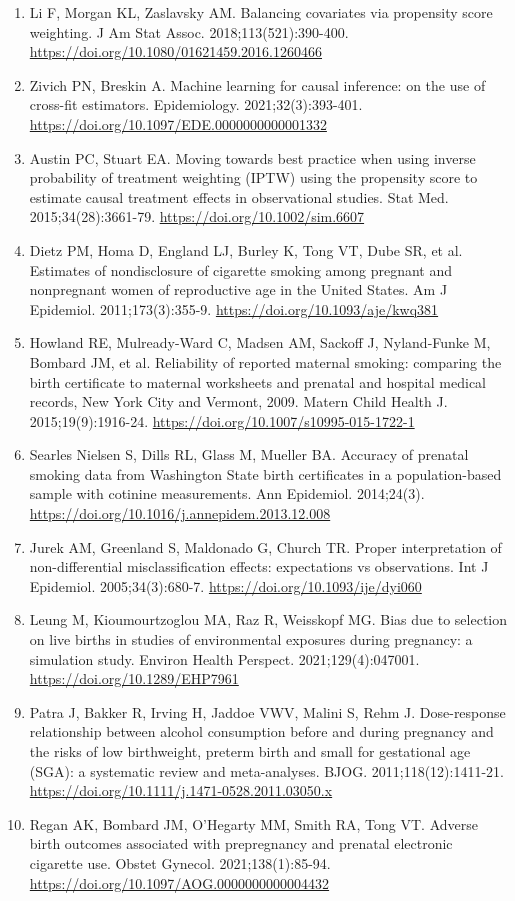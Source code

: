 {\begin{enumerate}[leftmargin=2.4em,labelsep=0.4em,itemsep=2pt,parsep=0pt,label={\arabic*.}]
\item Li F, Morgan KL, Zaslavsky AM. Balancing covariates via propensity score weighting. J Am Stat Assoc. 2018;113(521):390-400. \url{https://doi.org/10.1080/01621459.2016.1260466}
\item Zivich PN, Breskin A. Machine learning for causal inference: on the use of cross-fit estimators. Epidemiology. 2021;32(3):393-401. \url{https://doi.org/10.1097/EDE.0000000000001332}
\item Austin PC, Stuart EA. Moving towards best practice when using inverse probability of treatment weighting (IPTW) using the propensity score to estimate causal treatment effects in observational studies. Stat Med. 2015;34(28):3661-79. \url{https://doi.org/10.1002/sim.6607}
\item Dietz PM, Homa D, England LJ, Burley K, Tong VT, Dube SR, et al. Estimates of nondisclosure of cigarette smoking among pregnant and nonpregnant women of reproductive age in the United States. Am J Epidemiol. 2011;173(3):355-9. \url{https://doi.org/10.1093/aje/kwq381}
\item Howland RE, Mulready-Ward C, Madsen AM, Sackoff J, Nyland-Funke M, Bombard JM, et al. Reliability of reported maternal smoking: comparing the birth certificate to maternal worksheets and prenatal and hospital medical records, New York City and Vermont, 2009. Matern Child Health J. 2015;19(9):1916-24. \url{https://doi.org/10.1007/s10995-015-1722-1}
\item Searles Nielsen S, Dills RL, Glass M, Mueller BA. Accuracy of prenatal smoking data from Washington State birth certificates in a population-based sample with cotinine measurements. Ann Epidemiol. 2014;24(3). \url{https://doi.org/10.1016/j.annepidem.2013.12.008}
\item Jurek AM, Greenland S, Maldonado G, Church TR. Proper interpretation of non-differential misclassification effects: expectations vs observations. Int J Epidemiol. 2005;34(3):680-7. \url{https://doi.org/10.1093/ije/dyi060}
\item Leung M, Kioumourtzoglou MA, Raz R, Weisskopf MG. Bias due to selection on live births in studies of environmental exposures during pregnancy: a simulation study. Environ Health Perspect. 2021;129(4):047001. \url{https://doi.org/10.1289/EHP7961}
\item Patra J, Bakker R, Irving H, Jaddoe VWV, Malini S, Rehm J. Dose-response relationship between alcohol consumption before and during pregnancy and the risks of low birthweight, preterm birth and small for gestational age (SGA): a systematic review and meta-analyses. BJOG. 2011;118(12):1411-21. \url{https://doi.org/10.1111/j.1471-0528.2011.03050.x}
\item Regan AK, Bombard JM, O'Hegarty MM, Smith RA, Tong VT. Adverse birth outcomes associated with prepregnancy and prenatal electronic cigarette use. Obstet Gynecol. 2021;138(1):85-94. \url{https://doi.org/10.1097/AOG.0000000000004432}
\end{enumerate}}
